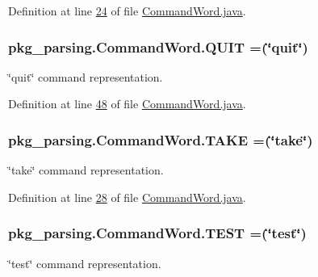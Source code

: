 Definition at line \hyperlink{CommandWord_8java_source_l00024}{24} of file \hyperlink{CommandWord_8java_source}{Command\-Word.\-java}.

\hypertarget{enumpkg__parsing_1_1CommandWord_a2f645cd1791d5576f42e1fe14d202c17}{
\subsubsection[{Q\-U\-I\-T}]{\setlength{\rightskip}{0pt plus 5cm}pkg\-\_\-parsing.\-Command\-Word.\-Q\-U\-I\-T =(\char`\"{}quit\char`\"{})}}\label{enumpkg__parsing_1_1CommandWord_a2f645cd1791d5576f42e1fe14d202c17}
\char`\"{}quit\char`\"{} command representation. 

Definition at line \hyperlink{CommandWord_8java_source_l00048}{48} of file \hyperlink{CommandWord_8java_source}{Command\-Word.\-java}.

\hypertarget{enumpkg__parsing_1_1CommandWord_ae5353500b91f141ae399403b5e87cc28}{
\subsubsection[{T\-A\-K\-E}]{\setlength{\rightskip}{0pt plus 5cm}pkg\-\_\-parsing.\-Command\-Word.\-T\-A\-K\-E =(\char`\"{}take\char`\"{})}}\label{enumpkg__parsing_1_1CommandWord_ae5353500b91f141ae399403b5e87cc28}
\char`\"{}take\char`\"{} command representation. 

Definition at line \hyperlink{CommandWord_8java_source_l00028}{28} of file \hyperlink{CommandWord_8java_source}{Command\-Word.\-java}.

\hypertarget{enumpkg__parsing_1_1CommandWord_acf61cb32b4d651f87b2cd342761f9a79}{
\subsubsection[{T\-E\-S\-T}]{\setlength{\rightskip}{0pt plus 5cm}pkg\-\_\-parsing.\-Command\-Word.\-T\-E\-S\-T =(\char`\"{}test\char`\"{})}}\label{enumpkg__parsing_1_1CommandWord_acf61cb32b4d651f87b2cd342761f9a79}
\char`\"{}test\char`\"{} command representation. 

